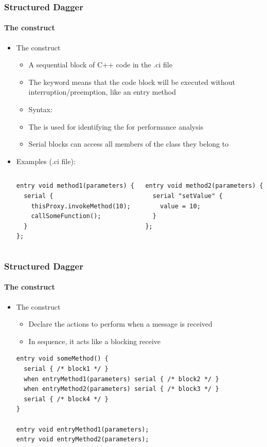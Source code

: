 \documentclass{beamer}
\begin{document}
\begin{frame}[fragile]
  \frametitle{Structured Dagger}
  \framesubtitle{The  construct}
  \begin{itemize}
    \item The  construct
      \begin{itemize}
        \item A sequential block of C++ code in the .ci file
        \item The keyword  means that the code block will be
          executed without interruption/preemption, like an entry method
        \item Syntax: 
        \item The  is used for identifying the
           for performance analysis
        \item Serial blocks can access all members of the class they belong to
      \end{itemize}
    \item Examples (.ci file):
  \begin{columns}
    \begin{column}{0.5\textwidth}
      \begin{lstlisting}[basicstyle=\tiny]
entry void method1(parameters) {
  serial {
    thisProxy.invokeMethod(10);
    callSomeFunction();
  }
};
      \end{lstlisting}
    \end{column}
    \begin{column}{0.5\textwidth}
      \begin{lstlisting}[basicstyle=\tiny]
entry void method2(parameters) {
  serial "setValue" {
    value = 10;
  }
};
      \end{lstlisting}
    \end{column}
  \end{columns}
  \end{itemize}
\end{frame}

\begin{frame}[fragile]
  \frametitle{Structured Dagger}
  \framesubtitle{The  construct}
  \begin{itemize}
    \item The  construct
      \begin{itemize}
        \item Declare the actions to perform when a message is received
        \item In sequence, it acts like a blocking receive
      \end{itemize}
      \begin{lstlisting}[basicstyle=\normalsize]
entry void someMethod() {
  serial { /* block1 */ }
  when entryMethod1(parameters) serial { /* block2 */ }
  when entryMethod2(parameters) serial { /* block3 */ }
  serial { /* block4 */ }
}

entry void entryMethod1(parameters);
entry void entryMethod2(parameters);
      \end{lstlisting}
    \end{itemize}
\end{frame}
\end{document}
